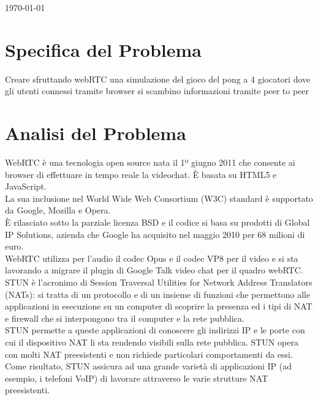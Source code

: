﻿\documentclass[11pt, a4paper, titlepage, block]{article}
\begin{document}
\begin{titlepage}
		{\today}\\[1cm]



		\newpage
		\tableofcontents
		\newpage

	\end{titlepage}

	\section{Specifica del Problema}
Creare sfruttando webRTC una simulazione del gioco del pong a 4 giocatori dove gli utenti connessi tramite browser si scambino informazioni tramite peer to peer

	\section{Analisi del Problema}

WebRTC è una tecnologia open source nata il 1º giugno 2011 che consente ai browser di effettuare in tempo reale la videochat. È basata su HTML5 e JavaScript.\\
La sua inclusione nel World Wide Web Consortium (W3C) standard è supportato da Google, Mozilla e Opera.\\
È rilasciato sotto la parziale licenza BSD e il codice si basa su prodotti di Global IP Solutions, azienda che Google ha acquisito nel maggio 2010 per 68 milioni di euro.\\
WebRTC utilizza per l'audio il codec Opus e il codec VP8 per il video e si sta lavorando a migrare il plugin di Google Talk video chat per il quadro webRTC.
\\
STUN è l'acronimo di Session Traversal Utilities for Network Address Translators (NATs): si tratta di un protocollo e di un insieme di funzioni che permettono alle applicazioni in esecuzione su un computer di scoprire la presenza ed i tipi di NAT e firewall che si interpongono tra il computer e la rete pubblica.\\
STUN permette a queste applicazioni di conoscere gli indirizzi IP e le porte con cui il dispositivo NAT li sta rendendo visibili sulla rete pubblica. STUN opera con molti NAT preesistenti e non richiede particolari comportamenti da essi.\\
Come risultato, STUN assicura ad una grande varietà di applicazioni IP (ad esempio, i telefoni VoIP) di lavorare attraverso le varie strutture NAT preesistenti.
\end{document}
